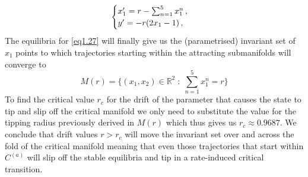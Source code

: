 \documentclass[../main.tex]{subfiles}
\begin{document}
\begin{example}[label=ex1.4]{}{}
\begin{equation}\label{eq1.27}
   \begin{cases}
      x'_{1} = r - \sum_{n=1}^{5}x_{1}^{n}  \,, \\
      y' = -r(2x_{1}-1) \,, 
   \end{cases}
\end{equation}
The equilibria for \eqref{eq1.27} will finally give us the (parametrised) invariant set of $x_{1}$ points to which trajectories starting within the attracting submanifolds will converge to
\begin{equation*}
        M(r) = \{(x_{1}, x_{2})\in \mathbb{R}^{2}\;:\;\sum_{n=1}^{5}x_{1}^{n}=r\}
\end{equation*}
To find the critical value $r_{c}$ for the drift of the parameter that causes the state to tip and slip off the critical manifold we only need to substitute the value for the tipping radius previously derived in $M(r)$ which thus gives us $r_{c}\approx 0.9687$.
We conclude that drift values $r>r_{c}$ will move the invariant set over and across the fold of the critical manifold meaning that even those trajectories that start within $C^{(a)}$ will slip off the stable equilibria and tip in a rate-induced critical transition.
\end{example}
\end{document}
